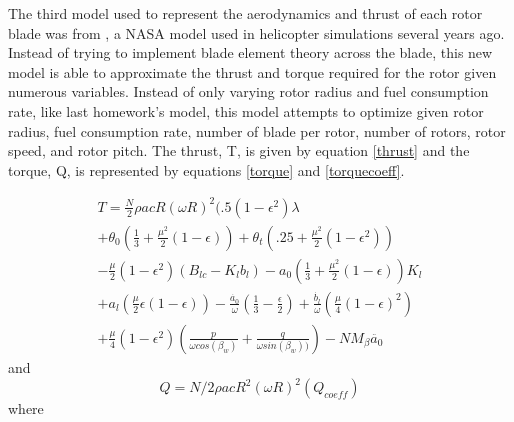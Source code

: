 \documentclass[letterpaper, 10 pt, conference]{ieeeconf}  %
\begin{document}
The third model used to represent the aerodynamics and thrust of each rotor blade was from \cite{chen1979simplified}, a NASA model used in helicopter simulations several years ago. Instead of trying to implement blade element theory across the blade, this new model is able to approximate the thrust and torque required for the rotor given numerous variables. Instead of only varying rotor radius and fuel consumption rate, like last homework's model, this model attempts to optimize given rotor radius, fuel consumption rate, number of blade per rotor, number of rotors, rotor speed, and rotor pitch. The thrust, T, is given by equation \ref{thrust} and the torque, Q, is represented by equations \ref{torque} and \ref{torquecoeff}.

\begin{multline}
T = \frac{N}{2} \rho a c R (\omega R)^2 (.5 (1-\epsilon^2) \lambda \\
 + \theta_0 (\frac{1}{3} + \frac{\mu^2}{2} (1-\epsilon)) + \theta_t (.25+\frac{\mu^2}{2} (1-\epsilon^2))\\
- \frac{\mu}{2} (1-\epsilon^2) (B_{lc}-K_l b_l) - a_0 (\frac{1}{3} +\frac{\mu^2}{2} (1-\epsilon)) K_l \\
+ a_l (\frac{\mu}{2} \epsilon (1-\epsilon)) - \frac{\dot{a_0}}{\omega} (\frac{1}{3} -\frac{\epsilon}{2}) + \frac{\dot{b_l}}{\omega} (\frac{\mu}{4} (1-\epsilon)^2) \\
+ \frac{\mu}{4} (1-\epsilon^2) (\frac{p}{\omega cos(\beta_w)} + \frac{q}{\omega sin(\beta_w))} ) - N M_\beta \ddot{a_0}
\label{thrust}
\end{multline}
and
\begin{equation}
Q = N/2 \rho a c R^2 (\omega R)^2 (Q_{coeff})
\label{torque}
\end{equation}
where
\end{document}

